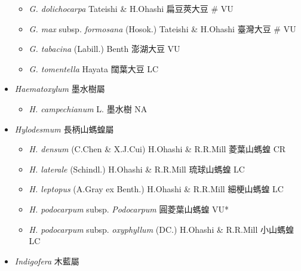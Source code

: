 \begin{itemize}
  \begin{itemize}
        \item[] \textit{G. dolichocarpa} Tateishi \& H.Ohashi  扁豆莢大豆  \# VU
        \item[] \textit{G. max} subsp. \textit{formosana} (Hosok.) Tateishi \& H.Ohashi  臺灣大豆  \# VU
        \item[] \textit{G. tabacina} (Labill.) Benth  澎湖大豆   VU
        \item[] \textit{G. tomentella} Hayata  闊葉大豆   LC
  \end{itemize}
 \item[] \textit{Haematoxylum} 墨水樹屬
                                
  \begin{itemize}
        \item[] \textit{H. campechianum} L.  墨水樹   NA
  \end{itemize}
 \item[] \textit{Hylodesmum} 長柄山螞蝗屬
                                
  \begin{itemize}
        \item[] \textit{H. densum} (C.Chen \& X.J.Cui) H.Ohashi \& R.R.Mill  菱葉山螞蝗   CR
        \item[] \textit{H. laterale} (Schindl.) H.Ohashi \& R.R.Mill  琉球山螞蝗   LC
        \item[] \textit{H. leptopus} (A.Gray ex Benth.) H.Ohashi \& R.R.Mill  細梗山螞蝗   LC
        \item[] \textit{H. podocarpum} subsp. \textit{Podocarpum}   圓菱葉山螞蝗   VU*
        \item[] \textit{H. podocarpum} subsp. \textit{oxyphyllum} (DC.) H.Ohashi \& R.R.Mill  小山螞蝗   LC
  \end{itemize}
 \item[] \textit{Indigofera} 木藍屬
                                

\end{itemize}
